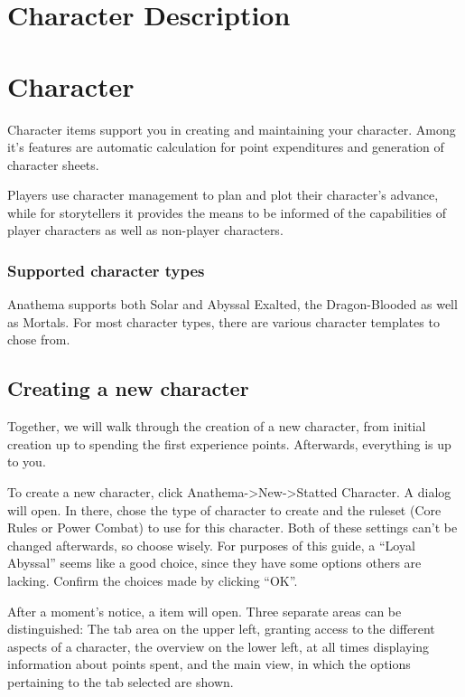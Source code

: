 \section{Character Description}\label{sec:CharacterDescription}

\section{Character}
Character items support you in creating and maintaining your character. Among it's features are automatic calculation for point expenditures and generation of character sheets. 

Players use character management to plan and plot their character's advance, while for storytellers it provides the means to be informed of the capabilities of player characters as well as non-player characters.

\subsubsection*{Supported character types}
Anathema supports both Solar and Abyssal Exalted, the Dragon-Blooded as well as Mortals. For most character types, there are various character templates to chose from.

\subsection{Creating a new character}
Together, we will walk through the creation of a new character, from initial creation up to spending the first experience points. Afterwards, everything is up to you.

To create a new character, click Anathema->New->Statted Character. A dialog will open. In there, chose the type of character to create and the ruleset (Core Rules or Power Combat) to use for this character. Both of these settings can't be changed afterwards, so choose wisely.
For purposes of this guide, a ``Loyal Abyssal'' seems like a good choice, since they have some options others are lacking. Confirm the choices made by clicking ``OK''.

After a moment's notice, a item will open.
Three separate areas can be distinguished: The tab area on the upper left, granting access to the different aspects of a character, the overview on the lower left, at all times displaying information about points spent, and the main view, in which the options pertaining to the tab selected are shown.

